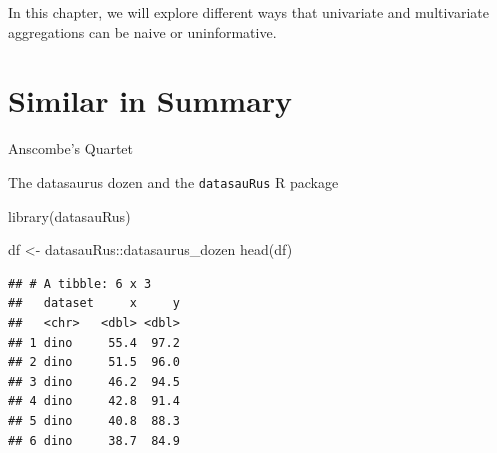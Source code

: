 \documentclass[
]{krantz}
\makeatletter
\newenvironment{Shaded}{\begin{snugshade}}{\end{snugshade}}
\newcommand{\FunctionTok}[1]{\textcolor[rgb]{0,0,0}{#1}}
\newcommand{\NormalTok}[1]{#1}
\newcommand{\OtherTok}[1]{\textcolor[rgb]{0.37,0.37,0.37}{#1}}
\newcommand{\SpecialCharTok}[1]{\textcolor[rgb]{0,0,0}{#1}}
\newenvironment{kframe}{%
\medskip{}
\setlength{\fboxsep}{.8em}
 \def\at@end@of@kframe{}%
 \ifinner\ifhmode%
  \def\at@end@of@kframe{\end{minipage}}%
  \begin{minipage}{\columnwidth}%
 \fi\fi%
 \def\FrameCommand##1{\hskip\@totalleftmargin \hskip-\fboxsep
 \colorbox{shadecolor}{##1}\hskip-\fboxsep
     \hskip-\linewidth \hskip-\@totalleftmargin \hskip\columnwidth}%
 \MakeFramed {\advance\hsize-\width
   \@totalleftmargin\z@ \linewidth\hsize
   \@setminipage}}%
 {\par\unskip\endMakeFramed%
 \at@end@of@kframe}
\renewenvironment{Shaded}{\begin{kframe}}{\end{kframe}}
\makeatother
\begin{document}
In this chapter, we will explore different ways that univariate and multivariate aggregations can be naive or uninformative.

\hypertarget{similar-in-summary}{%
\section{Similar in Summary}\label{similar-in-summary}}

Anscombe's Quartet

The datasaurus dozen \citep{datasaurus} and the \texttt{datasauRus} R package \citep{R-datasauRus}

\begin{Shaded}
\begin{Highlighting}[]
\FunctionTok{library}\NormalTok{(datasauRus)}
\end{Highlighting}
\end{Shaded}

\begin{Shaded}
\begin{Highlighting}[]
\NormalTok{df }\OtherTok{\textless{}{-}}\NormalTok{ datasauRus}\SpecialCharTok{::}\NormalTok{datasaurus\_dozen}
\FunctionTok{head}\NormalTok{(df)}
\end{Highlighting}
\end{Shaded}

\begin{verbatim}
## # A tibble: 6 x 3
##   dataset     x     y
##   <chr>   <dbl> <dbl>
## 1 dino     55.4  97.2
## 2 dino     51.5  96.0
## 3 dino     46.2  94.5
## 4 dino     42.8  91.4
## 5 dino     40.8  88.3
## 6 dino     38.7  84.9
\end{verbatim}
\end{document}
